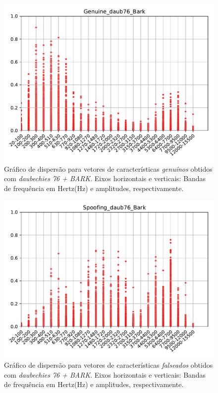 		\begin{figure}[H]
			\centering
			\includegraphics[scale=.8]{images/results/barkVersusMel/Genuine_daub76_Bark.pdf}
			\caption{Gráfico de dispersão para vetores de características \textit{genuínos} obtidos com \textit{daubechies 76 + BARK}.  Eixos horizontais e verticais: Bandas de frequência em Hertz(Hz) e amplitudes, respectivamente.}
			\label{fig:livedaub76bark}
		\end{figure}
		\begin{figure}[H]
			\centering
			\includegraphics[scale=.8]{images/results/barkVersusMel/Spoofing_daub76_Bark.pdf}
			\caption{Gráfico de dispersão para vetores de características \textit{falseados} obtidos com \textit{daubechies 76 + BARK}.  Eixos horizontais e verticais: Bandas de frequência em Hertz(Hz) e amplitudes, respectivamente.}
			\label{fig:spoofingdaub76bark}
		\end{figure}
